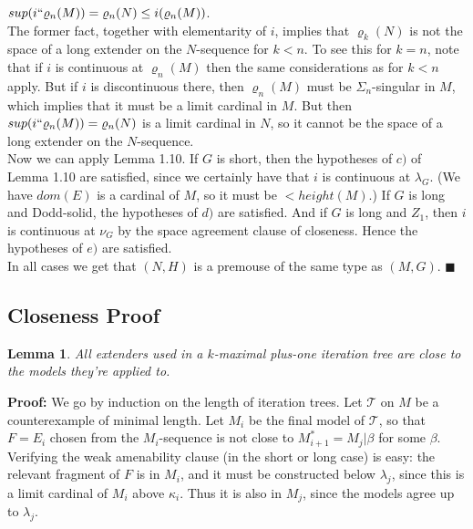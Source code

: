 \documentclass[12pt]{article}
\newtheorem{lem}[thm]{Lemma}
\begin{document}
\indent $sup ( i `` \varrho_n (M)) = \varrho_n (N) \leq i (\varrho_n (M))$.\\

The former fact, together with elementarity of $i$, implies that $\varrho_k (N)$ is not the space of a long extender on the $N$-sequence for $k < n$.  To see this for $k = n$, note that if $i$ is continuous at $\varrho_n(M)$ then the same considerations as for $k < n$ apply.  But if $i$ is discontinuous there, then $\varrho_n(M)$ must be $\Sigma_n$-singular in $M$, which implies that it must be a limit cardinal in $M$.  But then $sup ( i `` \varrho_n (M)) = \varrho_n (N)$ is a limit cardinal in $N$, so it cannot be the space of a long extender on the $N$-sequence.\\


Now we can apply Lemma 1.10.  If $G$ is short, then the hypotheses of $c)$ of Lemma 1.10 are satisfied, since we certainly have that $i$ is continuous at $\lambda_G$.  (We have $dom(E)$ is a cardinal of $M$, so it must be $< height(M)$.)  If $G$ is long and Dodd-solid, the hypotheses of $d)$ are satisfied.  And if $G$ is long and $Z_1$, then $i$ is continuous at $\nu_G$ by the space agreement clause of closeness.  Hence the hypotheses of $e)$ are satisfied.\\

In all cases we get that $(N, H)$ is a premouse of the same type as $(M, G)$.  $\blacksquare$\\






\subsection{Closeness Proof}








\begin{lem}
All extenders used in a $k$-maximal plus-one iteration tree are close to the models they're applied to.
 \end{lem}

\textbf{Proof:}  We go by induction on the length of iteration trees.  Let $\mathscr{T}$ on $M$ be a counterexample of minimal length.  Let $M_i$ be the final model of $\mathscr{T}$, so that $F = E_i$ chosen from the $M_i$-sequence is not close to $M_{i+1}^* = M_j | \beta$ for some $\beta$.  Verifying the weak amenability clause (in the short or long case) is easy: the relevant fragment of $F$ is in $M_i$, and it must be constructed below $\lambda_j$, since this is a limit cardinal of $M_i$ above $\kappa_i$.  Thus it is also in $M_j$, since the models agree up to $\lambda_j$.\
\end{document}
